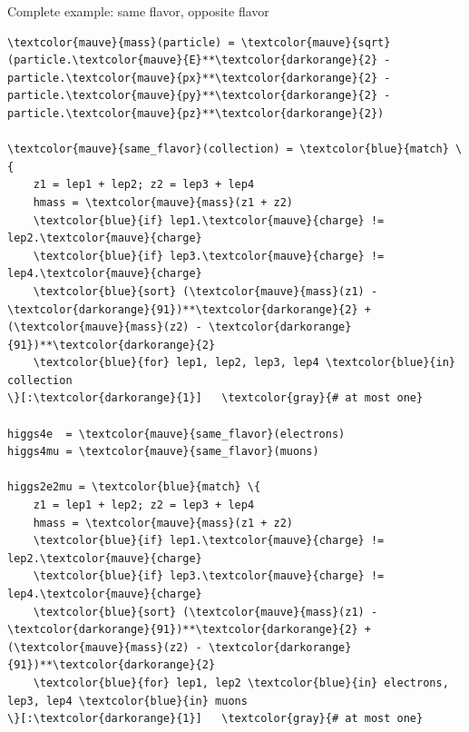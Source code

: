 \documentclass[aspectratio=169]{beamer}
\begin{document}
\begin{frame}[fragile]{Complete example: same flavor, opposite flavor}
\scriptsize
\vspace{0.25 cm}
\begin{Verbatim}[commandchars=\\\{\}]
\textcolor{mauve}{mass}(particle) = \textcolor{mauve}{sqrt}(particle.\textcolor{mauve}{E}**\textcolor{darkorange}{2} - particle.\textcolor{mauve}{px}**\textcolor{darkorange}{2} - particle.\textcolor{mauve}{py}**\textcolor{darkorange}{2} - particle.\textcolor{mauve}{pz}**\textcolor{darkorange}{2})

\textcolor{mauve}{same_flavor}(collection) = \textcolor{blue}{match} \{
    z1 = lep1 + lep2; z2 = lep3 + lep4
    hmass = \textcolor{mauve}{mass}(z1 + z2)
    \textcolor{blue}{if} lep1.\textcolor{mauve}{charge} != lep2.\textcolor{mauve}{charge}
    \textcolor{blue}{if} lep3.\textcolor{mauve}{charge} != lep4.\textcolor{mauve}{charge}
    \textcolor{blue}{sort} (\textcolor{mauve}{mass}(z1) - \textcolor{darkorange}{91})**\textcolor{darkorange}{2} + (\textcolor{mauve}{mass}(z2) - \textcolor{darkorange}{91})**\textcolor{darkorange}{2}
    \textcolor{blue}{for} lep1, lep2, lep3, lep4 \textcolor{blue}{in} collection
\}[:\textcolor{darkorange}{1}]   \textcolor{gray}{# at most one}

higgs4e  = \textcolor{mauve}{same_flavor}(electrons)
higgs4mu = \textcolor{mauve}{same_flavor}(muons)

higgs2e2mu = \textcolor{blue}{match} \{
    z1 = lep1 + lep2; z2 = lep3 + lep4
    hmass = \textcolor{mauve}{mass}(z1 + z2)
    \textcolor{blue}{if} lep1.\textcolor{mauve}{charge} != lep2.\textcolor{mauve}{charge}
    \textcolor{blue}{if} lep3.\textcolor{mauve}{charge} != lep4.\textcolor{mauve}{charge}
    \textcolor{blue}{sort} (\textcolor{mauve}{mass}(z1) - \textcolor{darkorange}{91})**\textcolor{darkorange}{2} + (\textcolor{mauve}{mass}(z2) - \textcolor{darkorange}{91})**\textcolor{darkorange}{2}
    \textcolor{blue}{for} lep1, lep2 \textcolor{blue}{in} electrons, lep3, lep4 \textcolor{blue}{in} muons
\}[:\textcolor{darkorange}{1}]   \textcolor{gray}{# at most one}
\end{Verbatim}
\end{frame}
\end{document}
